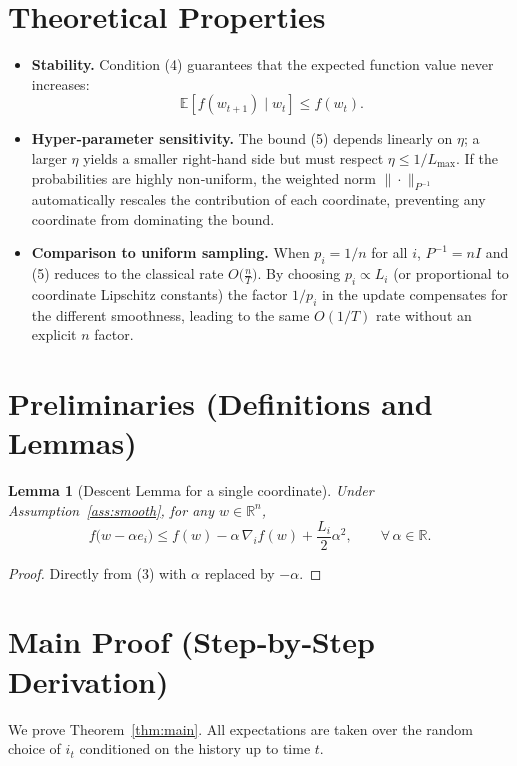 \documentclass{article}
\newtheorem{lemma}{Lemma}
\begin{document}
\section*{Theoretical Properties}
\begin{itemize}[leftmargin=*]
\item \textbf{Stability.} Condition (4) guarantees that the expected
function value never increases:
\[
\mathbb{E}[f(w_{t+1})\mid w_t]\le f(w_t). 
\]

\item \textbf{Hyper‑parameter sensitivity.}
The bound (5) depends linearly on $\eta$; a larger $\eta$ yields a
smaller right‑hand side but must respect $\eta\le1/L_{\max}$.
If the probabilities are highly non‑uniform, the weighted norm
$\|\cdot\|_{P^{-1}}$ automatically rescales the contribution of each
coordinate, preventing any coordinate from dominating the bound.

\item \textbf{Comparison to uniform sampling.}
When $p_i=1/n$ for all $i$, $P^{-1}=nI$ and (5) reduces to the classical
rate $O\!\bigl(\frac{n}{T}\bigr)$.  By choosing $p_i\propto L_i$ (or
proportional to coordinate Lipschitz constants) the factor $1/p_i$
in the update compensates for the different smoothness, leading to
the same $O(1/T)$ rate without an explicit $n$ factor.

\end{itemize}

\section*{Preliminaries (Definitions and Lemmas)}
\begin{lemma}[Descent Lemma for a single coordinate]\label{lem:descent}
Under Assumption~\ref{ass:smooth}, for any $w\in\mathbb{R}^{n}$,
\[
f\!\bigl(w-\alpha e_i\bigr)\le f(w)-\alpha\,\nabla_i f(w)+\frac{L_i}{2}\alpha^{2},
\qquad\forall\,\alpha\in\mathbb{R}.
\] 
\end{lemma}
\begin{proof}
Directly from (3) with $\alpha$ replaced by $-\alpha$.
\end{proof}

\section*{Main Proof (Step‑by‑Step Derivation)}
We prove Theorem~\ref{thm:main}.  All expectations are taken over the
random choice of $i_t$ conditioned on the history up to time $t$.
\end{document}
